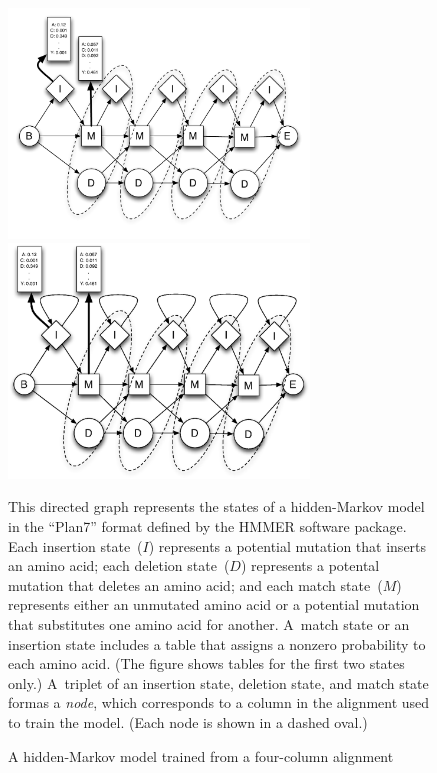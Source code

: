 \documentclass[preprint,nonatbib,blockstyle,nocopyrightspace,times]{sigplanconf}
\begin{document}
\begin{figure} 
\ifpdfmadness
\centerline{\includegraphics[width=8cm]{Plan7.pdf}} 
\else
\centerline{\includegraphics[width=8cm]{Plan7.eps}} 
\fi

This directed graph represents the states of a
hidden-Markov model in the ``Plan7'' format defined by the HMMER
software package.
Each insertion state~($I$) represents a potential mutation that 
inserts an amino acid;
each deletion state~($D$) represents a potental mutation that
deletes an amino acid;
and each match state~($M$) represents either
an unmutated amino acid or a potential mutation that
substitutes one amino acid for another.
A~match state or an insertion state includes a table that assigns a
nonzero probability to each amino acid.
(The figure shows tables for the first two states only.)
A~triplet of an insertion state, deletion state, 
and match state formas a \emph{node}, which corresponds to a column in
the alignment used to train the model.
(Each node is shown in a dashed oval.)

\caption{A hidden-Markov model trained from a four-column alignment}

\label{plan7} \end{figure}
\end{document}
